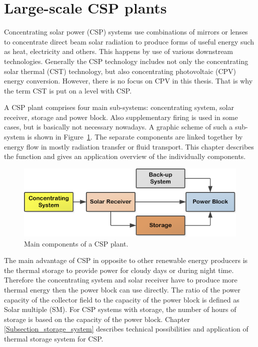 \section{Large-scale CSP plants}\label{Large scale concentrated solar power (CSP) plants}
Concentrating solar power (CSP) systems use combinations of mirrors or lenses to concentrate direct beam solar radiation to produce forms of useful energy such as heat, electricity and others. This happens by use of various downstream technologies. Generally the CSP technology includes not only the concentrating solar thermal (CST) technology, but also concentrating photovoltaic (CPV) energy conversion. However, there is no focus on CPV in this thesis. That is why the term CST is put on a level with CSP.

A CSP plant comprises four main sub-systems: concentrating system, solar receiver, storage and power block. Also supplementary firing is used in some cases, but is basically not necessary nowadays. A graphic scheme of such a sub-system is shown in Figure~\ref{MainComp}. The separate components are linked together by energy flow in mostly radiation transfer or fluid transport. This chapter describes the function and gives an application overview of the individually components. 
\begin{figure}[!h] 
\centering
\includegraphics[width=0.85\linewidth]{FIG/MainComp}
\caption[Main components of a CSP plant.]{Main components of a CSP plant.}\label{MainComp}
\end{figure}


The main advantage of CSP in opposite to other renewable energy producers is the thermal storage to provide power for cloudy days or during night time. Therefore the concentrating system and solar receiver have to produce more thermal energy then the power block can use directly. The ratio of the power capacity of the collector field to the capacity of the power block is defined as Solar multiple (SM). For CSP systems with storage, the number of hours of storage is based on the capacity of the power block. Chapter \ref{Subsection_storage_system} describes technical possibilities and application of thermal storage system for CSP.



